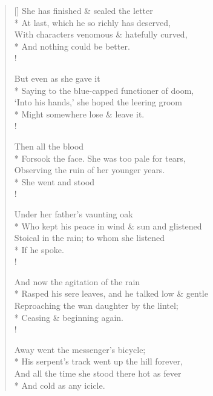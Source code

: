 \documentclass[MAIN]{subfiles}
\begin{document}
\settowidth{\versewidth}{\vin She has finished \& sealed the letter}
\begin{verse}[\versewidth]
\vin She has finished \& sealed the letter\\*
At last, which he so richly has deserved,\\
With characters venomous \& hatefully curved,\\*
\vin And nothing could be better.\\!

\vin But even as she gave it\\*
Saying to the blue-capped functioner of doom,\\
`Into his hands,' she hoped the leering groom\\*
\vin Might somewhere lose \& leave it.\\!

\vin Then all the blood\\*
Forsook the face. She was too pale for tears,\\
Observing the ruin of her younger years.\\*
\vin She went and stood\\!

\vin Under her father's vaunting oak\\*
Who kept his peace in wind \& sun and glistened\\
Stoical in the rain; to whom she listened\\*
\vin If he spoke.\\!

\vin And now the agitation of the rain\\*
Rasped his sere leaves, and he talked low \& gentle\\
Reproaching the wan daughter by the lintel;\\*
\vin Ceasing \& beginning again.\\!

\vin Away went the messenger's bicycle;\\*
His serpent’s track went up the hill forever,\\
And all the time she stood there hot as fever\\*
\vin And cold as any icicle.
\end{verse}
\end{document}
